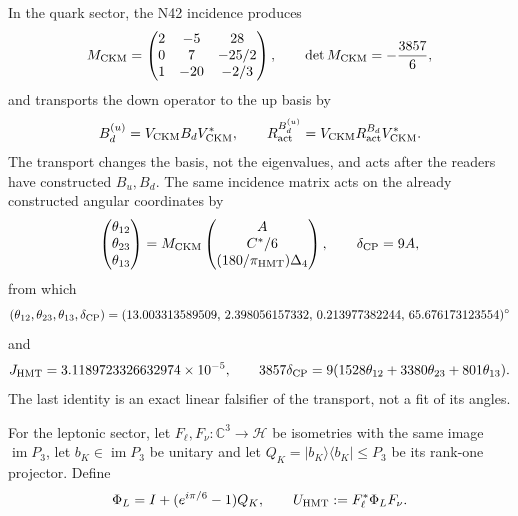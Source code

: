 In the quark sector, the N42 incidence produces
\begin{equation}
 M_{\rm CKM}=
 \begin{pmatrix}
 2&-5&28\\
 0&7&-25/2\\
 1&-20&-2/3
 \end{pmatrix},
 \qquad \det M_{\rm CKM}=-\frac{3857}{6},
 \label{10j-eq-matriz-ckm}
\end{equation}
and transports the down operator to the up basis by
\begin{equation}
 B_d^{(u)}=V_{\rm CKM}B_dV_{\rm CKM}^*,
 \qquad
 R_{\rm act}^{B_d^{(u)}}
 =V_{\rm CKM}R_{\rm act}^{B_d}V_{\rm CKM}^*.
 \label{10j-eq-transporte-ckm}
\end{equation}
The transport changes the basis, not the eigenvalues, and acts after the readers have constructed \(B_u,B_d\). The same incidence matrix acts on the already constructed angular coordinates by
\begin{equation}
 \begin{pmatrix}\theta_{12}\\\theta_{23}\\\theta_{13}\end{pmatrix}
 =M_{\rm CKM}
 \begin{pmatrix}
  A\\ C^*/6\\ (180/\pi_{\rm HMT})\Delta_4
 \end{pmatrix},
 \qquad \delta_{\rm CP}=9A,
 \label{10j-eq-angulos-ckm}
\end{equation}
from which
\begin{equation}
 (\theta_{12},\theta_{23},\theta_{13},\delta_{\rm CP})
 =(13.003313589509,\,2.398056157332,\,0.213977382244,
 \,65.676173123554)^\circ
 \label{10j-eq-salida-ckm}
\end{equation}
and
\begin{equation}
 J_{\rm HMT}=3.1189723326632974\times10^{-5},\qquad
 3857\delta_{\rm CP}
 =9(1528\theta_{12}+3380\theta_{23}+801\theta_{13}).
 \label{10j-eq-falsador-ckm}
\end{equation}
The last identity is an exact linear falsifier of the transport, not a fit of its angles.

For the leptonic sector, let \(F_\ell,F_\nu:\mathbb C^3\to\mathcal H\) be isometries with the same image \(\operatorname{im}P_3\), let \(b_K\in\operatorname{im}P_3\) be unitary and let \(Q_K=|b_K\rangle\langle b_K|\leq P_3\) be its rank-one projector. Define
\begin{equation}
 \Phi_L=I+(e^{i\pi/6}-1)Q_K,
 \qquad U_{\rm HMT}:=F_\ell^*\Phi_LF_\nu.
 \label{10j-eq-unitaria-leptonica}
\end{equation}

